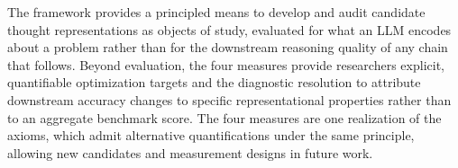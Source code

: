 The framework provides a principled means to develop and audit candidate thought representations as objects of study, evaluated for what an LLM encodes about a problem rather than for the downstream reasoning quality of any chain that follows. Beyond evaluation, the four measures provide researchers explicit, quantifiable optimization targets and the diagnostic resolution to attribute downstream accuracy changes to specific representational properties rather than to an aggregate benchmark score. The four measures are one realization of the axioms, which admit alternative quantifications under the same principle, allowing new candidates and measurement designs in future work.
